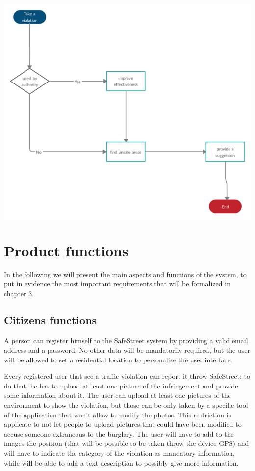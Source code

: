 \documentclass[a4paper, hidelinks, 12pt]{report}
\begin{document}
    \begin{center}
        \includegraphics[]{assets/buildStatistics.png}\\[1.6 cm]
    \end{center}
        \section{Product functions}\label{sec:product-functions}
         In the following we will present the main aspects and functions of the system, to put in evidence the most important requirements that will be formalized in chapter 3.
    \subsection{Citizens functions}\label{subsec:citizen-functions}
    A person can register himself to the SafeStreet system by providing a valid email address and a password. No other data will be mandatorily required, but the user will be allowed to set a residential location to personalize the user interface.

    Every registered user that see a traffic violation can report it throw SafeStreet: to do that, he has to upload at least one picture of the infringement and provide some information about it. The user can upload at least one pictures of the environment to show the violation, but those can be only taken by a specific tool of the application that won't allow to modify the photos. This restriction is applicate to not let people to upload pictures that could have been modified to accuse someone extraneous to the burglary. The user will have to add to the images the position (that will be possible to be taken throw the device GPS) and will have to indicate the category of the violation as mandatory information, while will be able to add a text description to possibly give more information.
\end{document}
